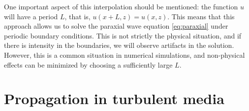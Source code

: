 \documentclass[openany,a4paper,oneside,11pt]{article}
\begin{document}
One important aspect of this interpolation should be mentioned: the function $u$ will have a period $L$, that is, $u(x+L,z) = u(x,z)$. This means that this approach allows us to solve the paraxial wave equation \eqref{eq:paraxial} under periodic boundary conditions. This is not strictly the physical situation, and if there is intensity in the boundaries, we will observe artifacts in the solution. However, this is a common situation in numerical simulations, and non-physical effects can be minimized by choosing a sufficiently large $L$.


\section{Propagation in turbulent media}

 

\end{document}
